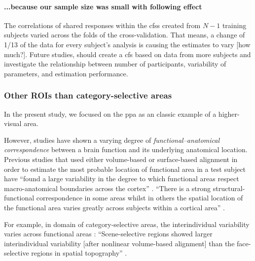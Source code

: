 \paragraph{...because our sample size was small with following effect}


The correlations of shared responses within the \acp{cfs} created from $N-1$
training subjects varied across the folds of the cross-validation.
That means, a change of 1/13 of the data for every subject's analysis is causing
the estimates to vary [how much?].
Future studies, should create a \ac{cfs} based on data from more subjects and
investigate the relationship between number of participants, variability of
parameters, and estimation performance.



\subsubsection{Other ROIs than category-selective areas}




%
In the present study, we focused on the \ac{ppa} as an classic example of a
higher-visual area.

%
However, studies have shown a varying degree of \textit{functional--anatomical
correspondence} between a brain function and its underlying anatomical location.
%
Previous studies that used either volume-based \citep{zhen2017quantifying,
zhen2015quantifying} or surface-based alignment \citep{rosenke2021probabilistic,
frost2012measuring} in order to estimate the most probable location of
functional area in a test subject have ``found a large variability in the degree
to which functional areas respect macro-anatomical boundaries across the
cortex'' \citep{frost2012measuring}.
%
``There is a strong structural-functional correspondence in some areas whilst in
others the spatial location of the functional area varies greatly across
subjects within a cortical area'' \citep{frost2012measuring}.

%
For example, in domain of category-selective areas, the interindividual
variability varies across functional areas \citep{zhen2017quantifying,
zhen2015quantifying, frost2012measuring}:
%
``Scene-selective regions showed larger interindividual variability [after
nonlinear volume-based alignment] than the face-selective regions in spatial
topography'' \citep{zhen2017quantifying}.


